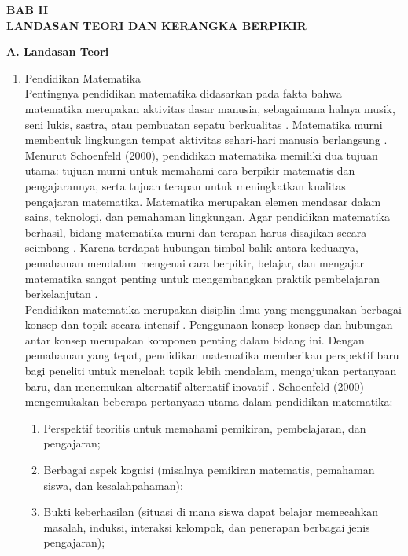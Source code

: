 \newpage
\begin{center}
    \textbf{BAB II}\\
    \textbf{LANDASAN TEORI DAN KERANGKA BERPIKIR}
\end{center}

\textbf{A. Landasan Teori}
\begin{enumerate}
    \item Pendidikan Matematika\\
    \hspace*{1cm}Pentingnya pendidikan matematika didasarkan pada fakta bahwa matematika merupakan aktivitas dasar manusia, sebagaimana halnya musik, seni lukis, sastra, atau pembuatan sepatu berkualitas \citep{hilton1984}. Matematika murni membentuk lingkungan tempat aktivitas sehari-hari manusia berlangsung \citep{yig2022}. Menurut Schoenfeld (2000), pendidikan matematika memiliki dua tujuan utama: tujuan murni untuk memahami cara berpikir matematis dan pengajarannya, serta tujuan terapan untuk meningkatkan kualitas pengajaran matematika. Matematika merupakan elemen mendasar dalam sains, teknologi, dan pemahaman lingkungan. Agar pendidikan matematika berhasil, bidang matematika murni dan terapan harus disajikan secara seimbang \citep{hilton1984}. Karena terdapat hubungan timbal balik antara keduanya, pemahaman mendalam mengenai cara berpikir, belajar, dan mengajar matematika sangat penting untuk mengembangkan praktik pembelajaran berkelanjutan \citep{schoenfeld2000}.\\
    \hspace*{1cm}Pendidikan matematika merupakan disiplin ilmu yang menggunakan berbagai konsep dan topik secara intensif \citep{turkdogan2015}. Penggunaan konsep-konsep dan hubungan antar konsep merupakan komponen penting dalam bidang ini. Dengan pemahaman yang tepat, pendidikan matematika memberikan perspektif baru bagi peneliti untuk menelaah topik lebih mendalam, mengajukan pertanyaan baru, dan menemukan alternatif-alternatif inovatif \citep{ernest2016}. Schoenfeld (2000) mengemukakan beberapa pertanyaan utama dalam pendidikan matematika:
    \begin{enumerate}
        \item Perspektif teoritis untuk memahami pemikiran, pembelajaran, dan pengajaran;
        \item Berbagai aspek kognisi (misalnya pemikiran matematis, pemahaman siswa, dan kesalahpahaman);
        \item Bukti keberhasilan (situasi di mana siswa dapat belajar memecahkan masalah, induksi, interaksi kelompok, dan penerapan berbagai jenis pengajaran);

\end{enumerate}
\end{enumerate}
